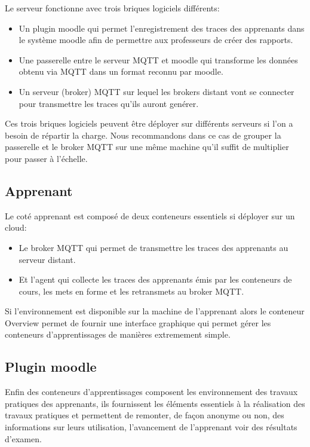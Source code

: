 \documentclass[a4paper,11pt]{report}
\begin{document}
Le serveur fonctionne avec trois briques logiciels différents:

\begin{itemize}
  \item Un plugin moodle qui permet l'enregistrement des traces des apprenants dans le système moodle afin de permettre aux professeurs de créer des rapports.
  \item Une passerelle entre le serveur MQTT et moodle qui transforme les données obtenu via MQTT dans un format reconnu par moodle.
  \item Un serveur (broker) MQTT sur lequel les brokers distant vont se connecter pour transmettre les traces qu'ils auront genérer.
\end{itemize}

Ces trois briques logiciels peuvent être déployer sur différents serveurs si l'on a besoin de répartir la charge. Nous recommandons dans ce cas de grouper la passerelle et le broker MQTT sur une même machine qu'il suffit de multiplier pour passer à l'échelle.

\subsection{Apprenant}

Le coté apprenant est composé de deux conteneurs essentiels si déployer sur un cloud:

\begin{itemize}
  \item Le broker MQTT qui permet de transmettre les traces des apprenants au serveur distant.
  \item Et l'agent qui collecte les traces des apprenants émis par les conteneurs de cours, les mets en forme et les retransmets au broker MQTT.
\end{itemize}

Si l'environnement est disponible sur la machine de l'apprenant alors le conteneur Overview permet de fournir une interface graphique qui permet gérer les conteneurs d'apprentissages de manières extremement simple.

\subsection{Plugin moodle}

Enfin des conteneurs d'apprentissages composent les environnement des travaux pratiques des apprenants, ils fournissent les éléments essentiels à la réalisation des travaux pratiques et permettent de remonter, de façon anonyme ou non, des informations sur leurs utilisation, l'avancement de l'apprenant voir des résultats d'examen.
\end{document}
